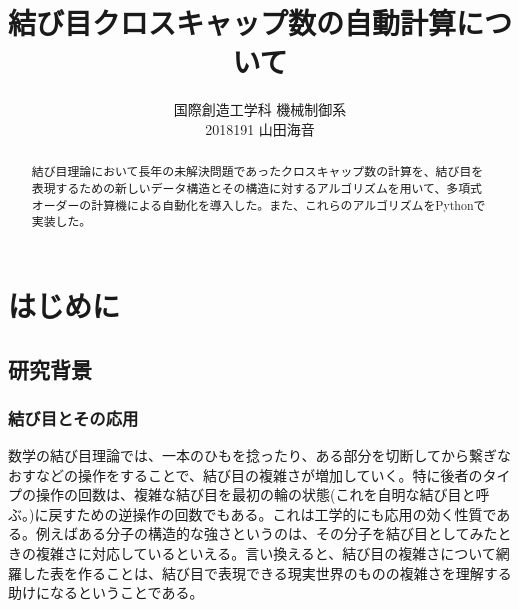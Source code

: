 \documentclass[11pt,a4j]{jarticle}
\title{結び目クロスキャップ数の自動計算について}
\author{国際創造工学科 機械制御系\\2018191 山田海音}
\date{} %
\begin{document}
\maketitle
\vspace{30mm}
\begin{abstract}
結び目理論において長年の未解決問題であったクロスキャップ数の計算を、結び目を表現するための新しいデータ構造とその構造に対するアルゴリズムを用いて、多項式オーダーの計算機による自動化を導入した。また、これらのアルゴリズムをPythonで実装した。
\end{abstract}

\thispagestyle{empty}
\clearpage
\addtocounter{page}{-1}


\tableofcontents
\clearpage

\pagestyle{plain}
\lhead{\rightmark}

\section{はじめに}
\subsection{研究背景}
\subsubsection{結び目とその応用}
数学の結び目理論では、一本のひもを捻ったり、ある部分を切断してから繋ぎなおすなどの操作をすることで、結び目の複雑さが増加していく。特に後者のタイプの操作の回数は、複雑な結び目を最初の輪の状態(これを自明な結び目と呼ぶ。)に戻すための逆操作の回数でもある。これは工学的にも応用の効く性質である。例えばある分子の構造的な強さというのは、その分子を結び目としてみたときの複雑さに対応しているといえる。言い換えると、結び目の複雑さについて網羅した表を作ることは、結び目で表現できる現実世界のものの複雑さを理解する助けになるということである。
\end{document}
